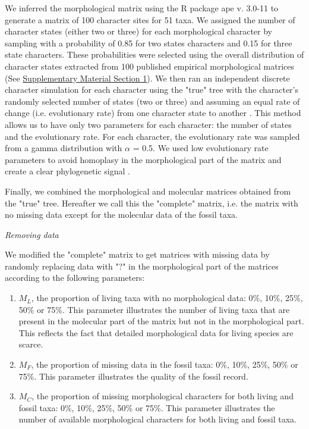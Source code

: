 \documentclass[12pt,letterpaper]{article}
\renewcommand{\subsection}[1]{%
\bigskip
\begin{center}
\begin{large}
\normalfont\itshape #1
\end{large}
\end{center}}
\begin{document}
We inferred the morphological matrix using the R package ape v. 3.0-11 \citep{paradisape:2004} to generate a matrix of 100 character sites for 51 taxa. We assigned the number of character states (either two or three) for each morphological character by sampling with a probability of 0.85 for two states characters and 0.15 for three state characters. These probabilities were selected using the overall distribution of character states extracted from 100 published empirical morphological matrices (See \hyperref[SupplementaryMaterial]{Supplementary Material Section 1}). We then ran an independent discrete character simulation for each character using the "true" tree with the character's randomly selected number of states (two or three) and assuming an equal rate of change (i.e. evolutionary rate) from one character state to another \citep{Pagel22011994}. This method allows us to have only two parameters for each character: the number of states and the evolutionary rate. For each character, the evolutionary rate was sampled from a gamma distribution with $\alpha$ = 0.5. We used low evolutionary rate parameters to avoid homoplasy in the morphological part of the matrix and create a clear phylogenetic signal \citep{wagner2000,davalosintegrating2014,wrightbayesian2014}.

Finally, we combined the morphological and molecular matrices obtained from the "true" tree. Hereafter we call this the "complete" matrix, i.e. the matrix with no missing data except for the molecular data of the fossil taxa.


\subsection{Removing data}
\label{Removing_data}
We modified the "complete" matrix to get matrices with missing data by randomly replacing data with "?" in the morphological part of the matrices according to the following parameters:%

\begin{enumerate}
\item{$M_{L}$, the proportion of living taxa with no morphological data: 0\%, 10\%, 25\%, 50\% or 75\%.}
This parameter illustrates the number of living taxa that are present in the molecular part of the matrix but not in the morphological part. This reflects the fact that detailed morphological data for living species are scarce.
\item{$M_{F}$, the proportion of missing data in the fossil taxa: 0\%, 10\%, 25\%, 50\% or 75\%.}
This parameter illustrates the quality of the fossil record. 
\item{$M_{C}$, the proportion of missing morphological characters for both living and fossil taxa: 0\%, 10\%, 25\%, 50\% or 75\%. }
This parameter illustrates the number of available morphological characters for both living and fossil taxa.
\end{enumerate}
\end{document}
